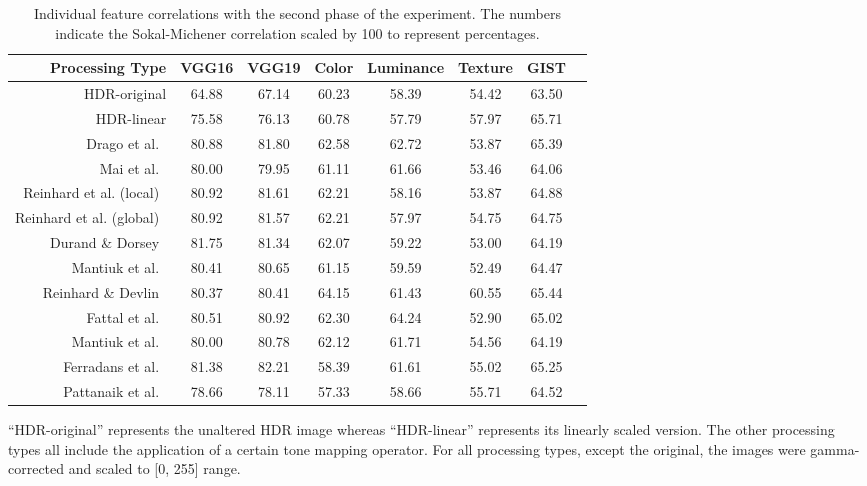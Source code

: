 \begin{landscape}
\begin{table}
\caption{Individual feature correlations with the second phase of the experiment. The numbers indicate the Sokal-Michener correlation scaled by 100 to represent percentages.}
\centering
\begin{tabular}{r|c c c c c c c}
\label{tab:ind_correlation_p2}
\textbf{Processing Type} & \textbf{VGG16} & \textbf{VGG19} & \textbf{Color} & \textbf{Luminance} & \textbf{Texture} & \textbf{GIST}\\
\hline
HDR-original & 64.88 & 67.14 & 60.23 & 58.39 & 54.42 & 63.50 \\
HDR-linear & 75.58 & 76.13 & 60.78 & 57.79 & 57.97 & 65.71 \\
Drago et al.~\cite{drago2003adaptive} & 80.88 & 81.80 & 62.58 & 62.72 & 53.87 & 65.39 \\
Mai et al.~\cite{mai2011subjective} & 80.00 & 79.95 & 61.11 & 61.66 & 53.46 & 64.06 \\
Reinhard et al. (local)~\cite{reinhard2002photographic} & 80.92 & 81.61 & 62.21 & 58.16 & 53.87 & 64.88 \\
Reinhard et al. (global)~\cite{reinhard2002photographic} & 80.92 & 81.57 & 62.21 & 57.97 & 54.75 & 64.75 \\
Durand \& Dorsey~\cite{durand2002fast} & 81.75 & 81.34 & 62.07 & 59.22 & 53.00 & 64.19 \\
Mantiuk et al.~\cite{mantiuk2006backward} & 80.41 & 80.65 & 61.15 & 59.59 & 52.49 & 64.47 \\ 
Reinhard \& Devlin~\cite{reinhard2005dynamic} & 80.37 & 80.41 & 64.15 & 61.43 & 60.55 & 65.44 \\
Fattal et al.~\cite{durand2002fast} & 80.51 & 80.92 & 62.30 & 64.24 & 52.90 & 65.02 \\
Mantiuk et al.~\cite{mantiuk2008modeling} & 80.00 & 80.78 & 62.12 & 61.71 & 54.56 & 64.19 \\
Ferradans et al.~\cite{ferradans2011analysis} & 81.38 & 82.21 & 58.39 & 61.61 & 55.02 & 65.25 \\
Pattanaik et al.~\cite{pattanaik2000time} & 78.66 & 78.11 & 57.33 & 58.66 & 55.71 & 64.52
\end{tabular}
\end{table}
\end{landscape}

“HDR-original” represents the unaltered HDR image whereas “HDR-linear” represents its linearly scaled version. The other processing types all include the application of a certain tone mapping operator. For all processing types, except the original, the images were gamma-corrected and scaled to [0, 255] range.

